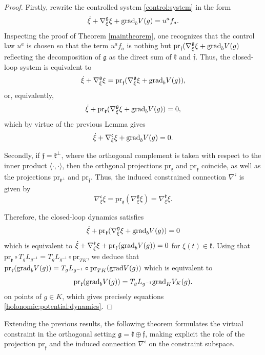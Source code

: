 \documentclass[letterpaper, 10 pt, conference]{ieeeconf}
\newcommand{\g}{\mathfrak{g}}
\newcommand{\grad}{\normalfont{\text{grad}}}
\begin{document}
\begin{proof}
 Firstly, rewrite the controlled system \eqref{control:system} in the form
    $$\dot{\xi} + \nabla^{\mathfrak{g}}_{\xi} \xi + \grad_{b} V(g)= u^{a}f_{a}.$$
    Inspecting the proof of Theorem \ref{maintheorem}, one recognizes that the control law $u^a$ is chosen so that the term $u^af_a$ is nothing but $\text{pr}_{\mathfrak{f}}(\nabla^{\mathfrak{g}}_{\xi} \xi + \grad_{b} V(g)$ reflecting the decomposition of $\g$ as the direct sum of $\mathfrak{k}$ and $\mathfrak{f}$. Thus, the closed-loop system is equivalent to
    $$\dot{\xi} + \nabla^{\mathfrak{g}}_{\xi} \xi = \text{pr}_{\mathfrak{f}}(\nabla^{\mathfrak{g}}_{\xi} \xi + \grad_{b} V(g)),$$
    or, equivalently,
    $$\dot{\xi} + \text{pr}_{\mathfrak{k}}(\nabla^{\mathfrak{g}}_{\xi} \xi + \grad_{b} V(g)) = 0,$$
    which by virtue of the previous Lemma gives
    $$\dot{\xi} + \nabla^{\mathfrak{c}}_{\xi} \xi  + \grad_{b} V(g)= 0.$$
    

    Secondly, if $\mathfrak{f}=\mathfrak{k}^{\bot}$, where the orthogonal complement is taken with respect to the inner product $\langle\cdot,\cdot\rangle$, then the orthgonal projections $\text{pr}_{\mathfrak{k}}$ and $\text{pr}_{\mathfrak{k}}$ coincide, as well as the projections $\text{pr}_{\mathfrak{k}^{\bot}}$ and $\text{pr}_{\mathfrak{f}}$. Thus, the induced constrained connection $\nabla^\mathfrak{c}$ is given by
    $$\nabla^\mathfrak{c}_\xi \xi = \text{pr}_{\mathfrak{k}} (\nabla^{\mathfrak{g}}_{\xi} \xi) = \nabla^{\mathfrak{k}}_{\xi} \xi.$$
    
    Therefore, the closed-loop dynamics satisfies
    $$\dot{\xi} + \text{pr}_{\mathfrak{k}} (\nabla^{\mathfrak{g}}_{\xi} \xi  + \grad_{b} V(g)) = 0$$
    which is equivalent to
    $\dot{\xi} + \nabla^{\mathfrak{k}}_{\xi} \xi  + \text{pr}_{\mathfrak{k}} (\grad_{b} V(g))= 0$
    for $\xi(t)\in \mathfrak{k}$. Using that $\text{pr}_{\mathfrak{k}} \circ T_{g}L_{g^{-1}} = T_{g}L_{g^{-1}} \circ \text{pr}_{TK}$, we deduce that
   $\text{pr}_{\mathfrak{k}} (\grad_{b} V(g)) = T_{g}L_{g^{-1}} \circ \text{pr}_{TK}(\grad V (g))$
    which is equivalent to
    $$\text{pr}_{\mathfrak{k}} (\grad_{b} V(g)) = T_{g}L_{g^{-1}} \grad_{K}V_{K}(g).$$
    on points of $g\in K$, which gives precisely equations \eqref{holonomic:potential:dynamics}.
\end{proof}

Extending the previous results, the following theorem formulates the virtual constraint in the 
orthogonal setting $\mathfrak{g} = \mathfrak{k} \oplus \mathfrak{f}$, 
making explicit the role of the projection $\text{pr}_{\mathfrak{f}}$ and the induced connection 
$\nabla^{\mathfrak{c}}$ on the constraint subspace.
\end{document}
